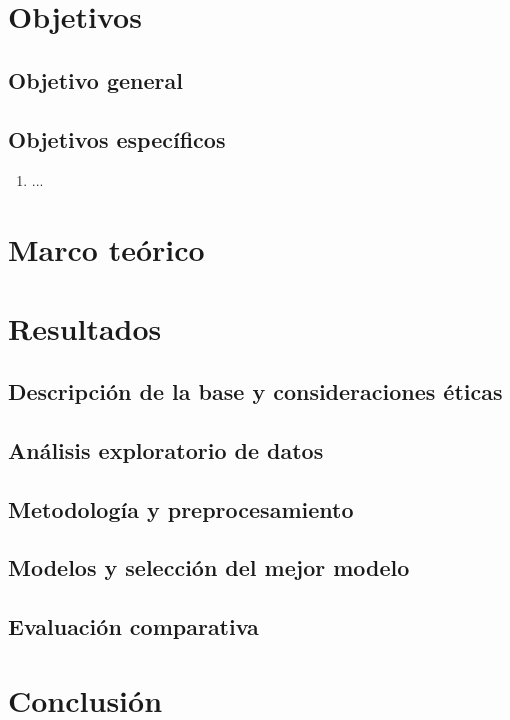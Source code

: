 \documentclass[12pt, a4paper]{article}
\begin{document}
\section{Objetivos}
\subsection{Objetivo general} %
\subsection{Objetivos específicos}
\begin{enumerate}[leftmargin=2em]
  \item ...
\end{enumerate}

\section{Marco teórico}

\section{Resultados}
\subsection{Descripción de la base y consideraciones éticas}
\subsection{Análisis exploratorio de datos} %
\subsection{Metodología y preprocesamiento}
\subsection{Modelos y selección del mejor modelo} %
\subsection{Evaluación comparativa} %

\section{Conclusión}
\end{document}
